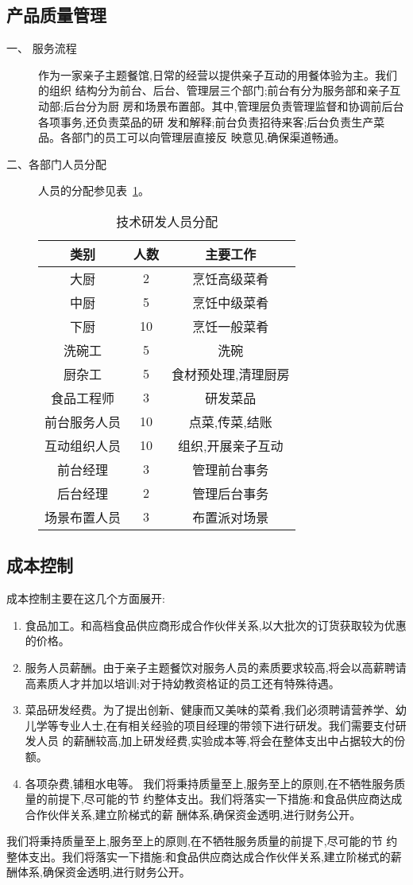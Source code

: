 \subsection{产品质量管理}
\begin{description}
\item[一、 服务流程]
作为一家亲子主题餐馆,日常的经营以提供亲子互动的用餐体验为主。我们的组织
结构分为前台、后台、管理层三个部门;前台有分为服务部和亲子互动部;后台分为厨
房和场景布置部。其中,管理层负责管理监督和协调前后台各项事务,还负责菜品的研
发和解释;前台负责招待来客;后台负责生产菜品。各部门的员工可以向管理层直接反
映意见,确保渠道畅通。

\item[二、各部门人员分配]
人员的分配参见表~\ref{tab:staffs}。
\begin{table}
\centering
\caption{技术研发人员分配}
\label{tab:staffs}
\begin{tabular}{|c|c|c|}
\hline
类别&人数&主要工作\\ \hline
大厨&2&烹饪高级菜肴\\ \hline
中厨&5&烹饪中级菜肴\\ \hline
下厨&10&烹饪一般菜肴\\ \hline
洗碗工&5&洗碗\\ \hline
厨杂工&5&食材预处理,清理厨房\\ \hline
食品工程师&3&研发菜品\\ \hline
前台服务人员&10&点菜,传菜,结账\\ \hline
互动组织人员&10&组织,开展亲子互动\\ \hline
前台经理&3&管理前台事务\\ \hline
后台经理&2&管理后台事务\\ \hline
场景布置人员&3&布置派对场景\\ \hline
\end{tabular}
\end{table}
\end{description}

\subsection{成本控制}
成本控制主要在这几个方面展开:
\begin{enumerate}
\item 食品加工。和高档食品供应商形成合作伙伴关系,以大批次的订货获取较为优惠
的价格。
\item 服务人员薪酬。由于亲子主题餐饮对服务人员的素质要求较高,将会以高薪聘请
高素质人才并加以培训;对于持幼教资格证的员工还有特殊待遇。
\item 菜品研发经费。为了提出创新、健康而又美味的菜肴,我们必须聘请营养学、幼
儿学等专业人士,在有相关经验的项目经理的带领下进行研发。我们需要支付研发人员
的薪酬较高,加上研发经费,实验成本等,将会在整体支出中占据较大的份额。
\item 各项杂费,铺租水电等。
我们将秉持质量至上,服务至上的原则,在不牺牲服务质量的前提下,尽可能的节
约整体支出。我们将落实一下措施:和食品供应商达成合作伙伴关系,建立阶梯式的薪
酬体系,确保资金透明,进行财务公开。
\end{enumerate}
我们将秉持质量至上,服务至上的原则,在不牺牲服务质量的前提下,尽可能的节
约整体支出。我们将落实一下措施:和食品供应商达成合作伙伴关系,建立阶梯式的薪
酬体系,确保资金透明,进行财务公开。

